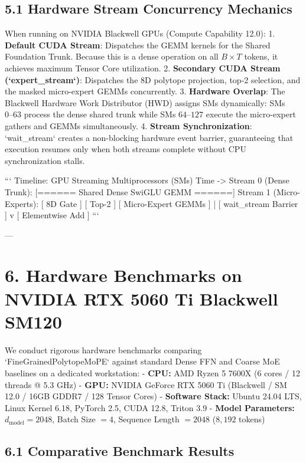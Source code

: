 \documentclass[11pt,twoside,openright]{amsbook}
\begin{document}
{{{{{{{{\subsection{5.1 Hardware Stream Concurrency Mechanics}

When running on NVIDIA Blackwell GPUs (Compute Capability 12.0):
1. \textbf{Default CUDA Stream}: Dispatches the GEMM kernels for the Shared Foundation Trunk. Because this is a dense operation on all $B \times T$ tokens, it achieves maximum Tensor Core utilization.
2. \textbf{Secondary CUDA Stream (`expert_stream`)}: Dispatches the 8D polytope projection, top-2 selection, and the masked micro-expert GEMMs concurrently.
3. \textbf{Hardware Overlap}: The Blackwell Hardware Work Distributor (HWD) assigns SMs dynamically: SMs $0\text{--}63$ process the dense shared trunk while SMs $64\text{--}127$ execute the micro-expert gathers and GEMMs simultaneously.
4. \textbf{Stream Synchronization}: `wait_stream` creates a non-blocking hardware event barrier, guaranteeing that execution resumes only when both streams complete without CPU synchronization stalls.

```
Timeline: GPU Streaming Multiprocessors (SMs)
Time ->
Stream 0 (Dense Trunk):  [====== Shared Dense SwiGLU GEMM ======]
Stream 1 (Micro-Experts): [ 8D Gate ] [ Top-2 ] [ Micro-Expert GEMMs ]
                                                                     |
                                                           [ wait_stream Barrier ]
                                                                     v
                                                            [ Elementwise Add ]
```

---

\section{6. Hardware Benchmarks on NVIDIA RTX 5060 Ti Blackwell SM120}

We conduct rigorous hardware benchmarks comparing `FineGrainedPolytopeMoPE` against standard Dense FFN and Coarse MoE baselines on a dedicated workstation:
- \textbf{CPU:} AMD Ryzen 5 7600X (6 cores / 12 threads @ 5.3 GHz)
- \textbf{GPU:} NVIDIA GeForce RTX 5060 Ti (Blackwell / SM 12.0 / 16GB GDDR7 / 128 Tensor Cores)
- \textbf{Software Stack:} Ubuntu 24.04 LTS, Linux Kernel 6.18, PyTorch 2.5, CUDA 12.8, Triton 3.9
- \textbf{Model Parameters:} $d_{\text{model}} = 2048$, Batch Size $= 4$, Sequence Length $= 2048$ ($8,192$ tokens)

\subsection{6.1 Comparative Benchmark Results}

}}}}}}}}
\end{document}
